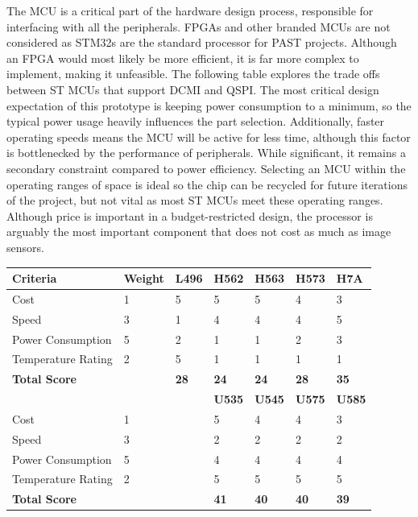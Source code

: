The MCU is a critical part of the hardware design process, responsible for interfacing with all the peripherals. FPGAs and other branded MCUs are not considered as STM32s are the standard processor for PAST projects. Although an FPGA would most likely be more efficient, it is far more complex to implement, making it unfeasible. The following table explores the trade offs between ST MCUs that support DCMI and QSPI.
\nl
The most critical design expectation of this prototype is keeping power consumption to a minimum, so the typical power usage heavily influences the part selection. Additionally, faster operating speeds means the MCU will be active for less time, although this factor is bottlenecked by the performance of peripherals. While significant, it remains a secondary constraint compared to power efficiency. Selecting an MCU within the operating ranges of space is ideal so the chip can be recycled for future iterations of the project, but not vital as most ST MCUs meet these operating ranges. Although price is important in a budget-restricted design, the processor is arguably the most important component that does not cost as much as image sensors. 

\begin{indentedfigure}
    \centering
    \begin{tabular}{|l|l|l|l|l|l|l|}
        \hline
        \textbf{Criteria} & \textbf{Weight} & \textbf{L496} & \textbf{H562} & \textbf{H563} & \textbf{H573} & \textbf{H7A} \\
        \hline
        Cost & 1 & 5 & 5 & 5 & 4 & 3 \\
        \hline
        Speed & 3 & 1 & 4 & 4 & 4 & 5 \\
        \hline
        Power Consumption & 5 & 2 & 1 & 1 & 2 & 3 \\
        \hline
        Temperature Rating & 2 & 5 & 1 & 1 & 1 & 1 \\
        \hline \hline
        \textbf{Total Score} & & \textbf{28} & \textbf{24} & \textbf{24} & \textbf{28} & \textbf{35} \\

        \hline \hline

        \textbf{} & \textbf{} & \textbf{} & \textbf{U535} & \textbf{U545} & \textbf{U575} & \textbf{U585} \\
        \hline
        Cost & 1 &  & 5 & 4 & 4 & 3 \\
        \hline
        Speed & 3 & & 2 & 2 & 2 & 2 \\
        \hline
        Power Consumption & 5 &  & 4 & 4 & 4 & 4 \\
        \hline
        Temperature Rating & 2 &  & 5 & 5 & 5 & 5 \\
        \hline \hline
        \textbf{Total Score} & & & \textbf{41} & \textbf{40} & \textbf{40} & \textbf{39} \\
        \hline
    \end{tabular}
    
    \caption{C2Sv1 MCU trade study between different processor lines on a scale (1-5).}
    \label{tab:v1-trade-mcu}
\end{indentedfigure}

